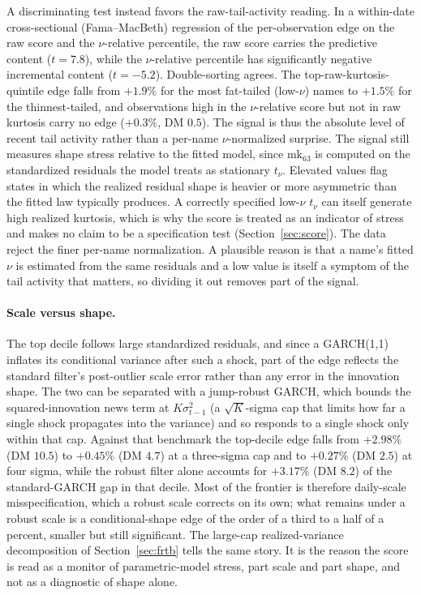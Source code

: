 \documentclass[11pt]{article}
\theoremstyle{remark}
\begin{document}
A discriminating test instead favors the raw-tail-activity reading.
In a within-date cross-sectional (Fama--MacBeth) regression of the
per-observation edge on the raw score and the $\nu$-relative percentile,
the raw score carries the predictive content ($t=7.8$), while the $\nu$-relative percentile has significantly negative incremental content ($t=-5.2$). Double-sorting agrees. The top-raw-kurtosis-quintile edge falls from $+1.9\%$ for the most fat-tailed (low-$\nu$) names to $+1.5\%$ for the thinnest-tailed, and observations high in the $\nu$-relative score but not in raw kurtosis carry no edge ($+0.3\%$, DM $0.5$). The signal is thus the absolute level of recent tail activity rather than
a per-name $\nu$-normalized surprise. The signal still measures shape
stress relative to the fitted model, since $\mathrm{mk}_{63}$ is computed on the
standardized residuals the model treats as stationary $t_\nu$.
Elevated values flag states in which the realized residual shape is
heavier or more asymmetric than the fitted law typically produces. A correctly specified low-$\nu$ $t_\nu$ can itself generate high realized kurtosis, which is why the score is treated as an indicator of stress and makes no claim to be a specification test (Section~\ref{sec:score}). The data reject the finer per-name normalization. A plausible reason is that a name's fitted $\nu$ is estimated from the same residuals and a low value is itself a symptom of the tail activity that matters, so dividing it out removes part of the signal.

\paragraph{Scale versus shape.} The top decile follows large
standardized residuals, and since a GARCH(1,1) inflates its conditional
variance after such a shock, part of the edge reflects the standard
filter's post-outlier scale error rather than any error in the
innovation shape. The two can be separated with a jump-robust GARCH,
which bounds the squared-innovation news term at $K\sigma_{t-1}^2$ (a
$\sqrt{K}$-sigma cap that limits how far a single shock propagates into the
variance) and so responds to a single shock only within that cap. Against that benchmark the top-decile
edge falls from $+2.98\%$ (DM $10.5$) to $+0.45\%$ (DM $4.7$) at a
three-sigma cap and to $+0.27\%$ (DM $2.5$) at four sigma, while the
robust filter alone accounts for $+3.17\%$ (DM $8.2$) of the
standard-GARCH gap in that decile. Most of the frontier is therefore
daily-scale misspecification, which a robust scale corrects on its own;
what remains under a robust scale is a conditional-shape edge of the order
of a third to a half of a percent, smaller but still significant. The
large-cap realized-variance decomposition of Section~\ref{sec:frtb}
tells the same story. It is the reason the score is read as a monitor of
parametric-model stress, part scale and part shape, and not as a
diagnostic of shape alone.
\end{document}
